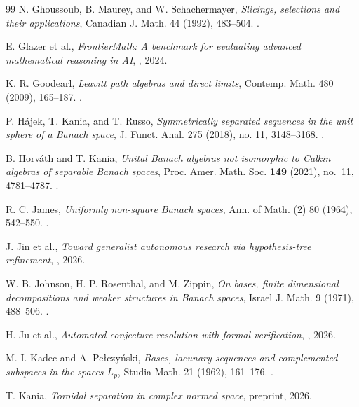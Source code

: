 \documentclass[11pt,reqno]{amsart}
\theoremstyle{plain}
\theoremstyle{definition}
\begin{document}
\begin{thebibliography}{99}
N. Ghoussoub, B. Maurey, and W. Schachermayer,
\newblock \emph{Slicings, selections and their applications},
\newblock Canadian J. Math. 44 (1992), 483--504.
\newblock {}.

E. Glazer et al.,
\newblock \emph{FrontierMath: A benchmark for evaluating advanced mathematical reasoning in AI},
\newblock {}, 2024.

K. R. Goodearl,
\newblock \emph{Leavitt path algebras and direct limits},
\newblock Contemp. Math. 480 (2009), 165--187.
\newblock {}.

P. H\'ajek, T. Kania, and T. Russo,
\newblock \emph{Symmetrically separated sequences in the unit sphere of a Banach space},
\newblock J. Funct. Anal. 275 (2018), no. 11, 3148--3168.
\newblock {}.

B. Horv\'ath and T. Kania,
\newblock \emph{Unital Banach algebras not isomorphic to Calkin algebras
of separable Banach spaces},
\newblock Proc. Amer. Math. Soc. \textbf{149} (2021), no.~11, 4781--4787.
\newblock {}.

R. C. James,
\newblock \emph{Uniformly non-square Banach spaces},
\newblock Ann. of Math. (2) 80 (1964), 542--550.
\newblock {}.

J. Jin et al.,
\newblock \emph{Toward generalist autonomous research via hypothesis-tree refinement},
\newblock {}, 2026.

W. B. Johnson, H. P. Rosenthal, and M. Zippin,
\newblock \emph{On bases, finite dimensional decompositions and weaker structures in Banach spaces},
\newblock Israel J. Math. 9 (1971), 488--506.
\newblock {}.

H. Ju et al.,
\newblock \emph{Automated conjecture resolution with formal verification},
\newblock {}, 2026.

M. I. Kadec and A. Pe{\l}czy\'nski,
\newblock \emph{Bases, lacunary sequences and complemented subspaces in the spaces $L_p$},
\newblock Studia Math. 21 (1962), 161--176.
\newblock {}.

T. Kania,
\newblock \emph{Toroidal separation in complex normed space},
\newblock preprint, 2026.


\end{thebibliography}
\end{document}
